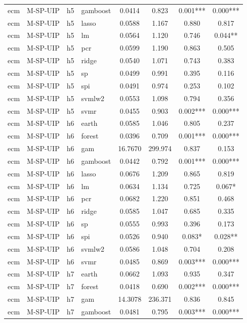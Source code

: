 \begin{ThreePartTable}
\begin{longtable}[t]{llclcccc}
ecm & M-SP-UIP & h5 & gamboost & 0.0414 & 0.823 & 0.001*** & 0.000***\\
ecm & M-SP-UIP & h5 & lasso & 0.0588 & 1.167 & 0.880 & 0.817\\
ecm & M-SP-UIP & h5 & lm & 0.0564 & 1.120 & 0.746 & 0.044**\\
ecm & M-SP-UIP & h5 & pcr & 0.0599 & 1.190 & 0.863 & 0.505\\
ecm & M-SP-UIP & h5 & ridge & 0.0540 & 1.071 & 0.743 & 0.383\\
ecm & M-SP-UIP & h5 & sp & 0.0499 & 0.991 & 0.395 & 0.116\\
ecm & M-SP-UIP & h5 & spi & 0.0491 & 0.974 & 0.253 & 0.102\\
ecm & M-SP-UIP & h5 & svmlw2 & 0.0553 & 1.098 & 0.794 & 0.356\\
ecm & M-SP-UIP & h5 & svmr & 0.0455 & 0.903 & 0.002*** & 0.000***\\
\addlinespace
ecm & M-SP-UIP & h6 & earth & 0.0585 & 1.046 & 0.805 & 0.237\\
ecm & M-SP-UIP & h6 & forest & 0.0396 & 0.709 & 0.001*** & 0.000***\\
ecm & M-SP-UIP & h6 & gam & 16.7670 & 299.974 & 0.837 & 0.153\\
ecm & M-SP-UIP & h6 & gamboost & 0.0442 & 0.792 & 0.001*** & 0.000***\\
ecm & M-SP-UIP & h6 & lasso & 0.0676 & 1.209 & 0.865 & 0.819\\
ecm & M-SP-UIP & h6 & lm & 0.0634 & 1.134 & 0.725 & 0.067*\\
ecm & M-SP-UIP & h6 & pcr & 0.0682 & 1.220 & 0.851 & 0.468\\
ecm & M-SP-UIP & h6 & ridge & 0.0585 & 1.047 & 0.685 & 0.335\\
ecm & M-SP-UIP & h6 & sp & 0.0555 & 0.993 & 0.396 & 0.173\\
ecm & M-SP-UIP & h6 & spi & 0.0526 & 0.940 & 0.083* & 0.028**\\
ecm & M-SP-UIP & h6 & svmlw2 & 0.0586 & 1.048 & 0.704 & 0.208\\
ecm & M-SP-UIP & h6 & svmr & 0.0485 & 0.869 & 0.003*** & 0.000***\\
\addlinespace
ecm & M-SP-UIP & h7 & earth & 0.0662 & 1.093 & 0.935 & 0.347\\
ecm & M-SP-UIP & h7 & forest & 0.0418 & 0.690 & 0.002*** & 0.000***\\
ecm & M-SP-UIP & h7 & gam & 14.3078 & 236.371 & 0.836 & 0.845\\
ecm & M-SP-UIP & h7 & gamboost & 0.0481 & 0.795 & 0.003*** & 0.000***\\

\end{longtable}
\end{ThreePartTable}
